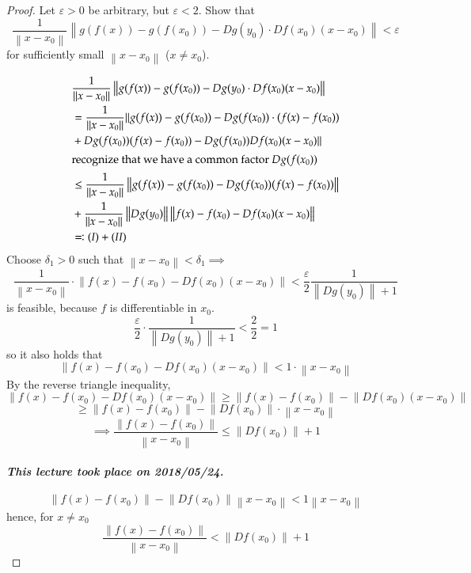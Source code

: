 \documentclass{article}
\newcommand{\norm}[1]{\left\|#1\right\|}
\newcommand{\dateref}[1]{\paragraph{\textit{This lecture took place on #1.}}}
\begin{document}
\begin{proof}
  Let $\varepsilon > 0$ be arbitrary, but $\varepsilon < 2$.
  Show that
  \[ \frac1{\norm{x - x_0}} \norm{g(f(x)) - g(f(x_0)) - Dg(y_0) \cdot Df(x_0) (x - x_0)} < \varepsilon \]
  for sufficiently small $\norm{x - x_0}$ ($x \neq x_0$).

  \begin{align*}
    &\frac1{\norm{x - x_0}} \norm{g(f(x)) - g(f(x_0)) - Dg(y_0) \cdot Df(x_0) (x - x_0)} \\
    &= \frac1{\norm{x - x_0}} \| g(f(x)) - g(f(x_0)) - Dg(f(x_0)) \cdot (f(x) - f(x_0)) \\
    &+ Dg(f(x_0)) (f(x) - f(x_0)) - Dg(f(x_0)) Df(x_0) (x - x_0) \| \\
  \intertext{recognize that we have a common factor $Dg(f(x_0))$}
    &\leq \frac{1}{\norm{x - x_0}} \norm{g(f(x)) - g(f(x_0)) - Dg(f(x_0))(f(x) - f(x_0))} \\
    &+ \frac{1}{\norm{x - x_0}} \norm{Dg(y_0)} \norm{f(x) - f(x_0) - Df(x_0)(x - x_0)} \\
    &\eqqcolon (I) + (II)
  \end{align*}
  Choose $\delta_1 > 0$ such that $\norm{x - x_0} < \delta_1 \implies$
  \[ \frac{1}{\norm{x - x_0}} \cdot \norm{f(x) - f(x_0) - Df(x_0) (x - x_0)} < \frac{\varepsilon}2 \frac{1}{\norm{Dg(y_0)} + 1} \]
  is feasible, because $f$ is differentiable in $x_0$.
  \[ \frac{\varepsilon}{2} \cdot \frac{1}{\norm{Dg(y_0)} + 1} < \frac22 = 1 \]
  so it also holds that
  \[ \norm{f(x) - f(x_0) - Df(x_0) (x - x_0)} < 1 \cdot \norm{x - x_0} \]
  By the reverse triangle inequality,
  \[ \norm{f(x) - f(x_0) - Df(x_0) (x - x_0)} \geq \norm{f(x) - f(x_0)} - \norm{Df(x_0) (x - x_0)} \]
  \[ \geq \norm{f(x) - f(x_0)} - \norm{Df(x_0)} \cdot \norm{x - x_0} \]
  \[ \implies \frac{\norm{f(x) - f(x_0)}}{\norm{x - x_0}} \leq \norm{Df(x_0)} + 1 \]

  \dateref{2018/05/24}

  \[ \norm{f(x) - f(x_0)} - \norm{Df(x_0)} \norm{x - x_0} < 1 \norm{x - x_0} \]
  hence, for $x \neq x_0$
  \[ \frac{\norm{f(x) - f(x_0)}}{\norm{x - x_0}} < \norm{Df(x_0)} + 1 \]


\end{proof}
\end{document}
